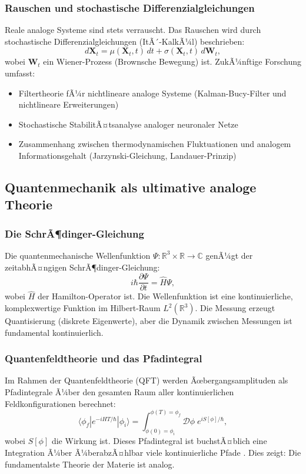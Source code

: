 ﻿\documentclass[a4paper,12pt]{article}
\theoremstyle{definition}
\begin{document}
\subsubsection{Rauschen und stochastische Differenzialgleichungen}

Reale analoge Systeme sind stets verrauscht.  Das Rauschen wird durch
stochastische Differenzialgleichungen (ItÃ´-KalkÃ¼l) beschrieben:
\[
d\mathbf{X}_t = \mu(\mathbf{X}_t, t) \, dt + \sigma(\mathbf{X}_t, t) \, d\mathbf{W}_t,
\]
wobei $\mathbf{W}_t$ ein Wiener-Prozess (Brownsche Bewegung) ist.
ZukÃ¼nftige Forschung umfasst:
\begin{itemize}
    \item Filtertheorie fÃ¼r nichtlineare analoge Systeme (Kalman-Bucy-Filter
          und nichtlineare Erweiterungen)
    \item Stochastische StabilitÃ¤tsanalyse analoger neuronaler Netze
    \item Zusammenhang zwischen thermodynamischen Fluktuationen und analogem
          Informationsgehalt (Jarzynski-Gleichung, Landauer-Prinzip)
\end{itemize}

\subsection{Quantenmechanik als ultimative analoge Theorie}

\subsubsection{Die SchrÃ¶dinger-Gleichung}

Die quantenmechanische Wellenfunktion $\Psi: \mathbb{R}^3 \times \mathbb{R} \to \mathbb{C}$
genÃ¼gt der zeitabhÃ¤ngigen SchrÃ¶dinger-Gleichung:
\[
i\hbar \frac{\partial \Psi}{\partial t} = \hat{H} \Psi,
\]
wobei $\hat{H}$ der Hamilton-Operator ist.  Die Wellenfunktion ist eine
kontinuierliche, komplexwertige Funktion im Hilbert-Raum $L^2(\mathbb{R}^3)$.
Die Messung erzeugt Quantisierung (diskrete Eigenwerte), aber die Dynamik
zwischen Messungen ist fundamental kontinuierlich.

\subsubsection{Quantenfeldtheorie und das Pfadintegral}

Im Rahmen der Quantenfeldtheorie (QFT) werden Ãœbergangsamplituden als
Pfadintegrale Ã¼ber den gesamten Raum aller kontinuierlichen Feldkonfigurationen
berechnet:
\[
\langle \phi_f | e^{-iHT/\hbar} | \phi_i \rangle
= \int_{\phi(0)=\phi_i}^{\phi(T)=\phi_f} \mathcal{D}\phi \; e^{iS[\phi]/\hbar},
\]
wobei $S[\phi]$ die Wirkung ist.  Dieses Pfadintegral ist buchstÃ¤blich eine
Integration Ã¼ber Ã¼berabzÃ¤hlbar viele kontinuierliche Pfade \citep{Feynman1965}.
Dies zeigt: Die fundamentalste Theorie der Materie ist analog.
\end{document}
